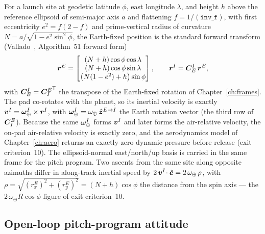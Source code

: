 For a launch site at geodetic latitude $\phi$, east longitude $\lambda$, and
height $h$ above the reference ellipsoid of semi-major axis $a$ and
flattening $f = 1/(\texttt{inv\_f})$, with first eccentricity
$e^{2} = f(2 - f)$ and prime-vertical radius of curvature
$N = a/\sqrt{1 - e^{2}\sin^{2}\phi}$, the Earth-fixed position is the
standard forward transform (Vallado~\cite{vallado2013}, Algorithm~51 forward
form)
\begin{equation}
  \bm{r}^{E} =
  \begin{bmatrix}
    (N + h)\cos\phi\cos\lambda \\
    (N + h)\cos\phi\sin\lambda \\
    \bigl(N(1 - e^{2}) + h\bigr)\sin\phi
  \end{bmatrix},
  \qquad
  \bm{r}^{I} = \bm{C}_{E}^{I}\,\bm{r}^{E},
  \label{eq:vehicle6dof:padstate}
\end{equation}
with $\bm{C}_{E}^{I} = {\bm{C}_{I}^{E}}^{\mathsf T}$ the transpose of the Earth-fixed
rotation of Chapter~\ref{ch:frames}. The pad co-rotates with the planet, so
its inertial velocity is exactly
$\bm{v}^{I} = \bm{\omega}_{\oplus}^{I} \times \bm{r}^{I}$, with
$\bm{\omega}_{\oplus}^{I} = \omega_{\oplus}\,\hat{\bm{z}}^{E\to I}$ the Earth
rotation vector (the third row of $\bm{C}_{I}^{E}$). Because the same
$\bm{\omega}_{\oplus}^{I}$ forms $\bm{v}^{I}$ and later forms the
air-relative velocity, the on-pad air-relative velocity is exactly zero, and
the aerodynamics model of Chapter~\ref{ch:aero} returns an exactly-zero
dynamic pressure before release (exit criterion~10). The ellipsoid-normal
east/north/up basis is carried in the same frame for the pitch program. Two
ascents from the same site along opposite azimuths differ in along-track
inertial speed by $2\,\bm{v}^{I}\!\cdot\hat{\bm{e}} =
2\,\omega_{\oplus}\,\rho$, with $\rho = \sqrt{(r^{E}_{x})^{2} +
(r^{E}_{y})^{2}} = (N + h)\cos\phi$ the distance from the spin axis --- the
$2\,\omega_{\oplus} R\cos\phi$ figure of exit criterion~10.

\subsection{Open-loop pitch-program attitude}

